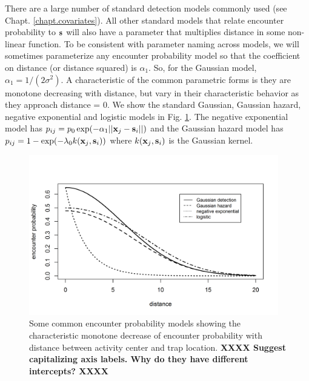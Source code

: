 There are a large number of standard detection models commonly used
(see Chapt. \ref{chapt.covariates}).  All other standard models that
relate encounter probability to ${\bf s}$ will also have a parameter
that multiplies distance in some non-linear function.  To be
consistent with parameter naming across models, we will sometimes
parameterize any encounter probability model so that the coefficient
on distance (or distance squared) is $\alpha_{1}$. So, for the
Gaussian model, $\alpha_{1} = 1/(2\sigma^{2})$.  A characteristic of
the common parametric forms is they are monotone decreasing with
distance, but vary in their characteristic behavior as they approach
distance = 0.  We show the standard Gaussian, Gaussian hazard,
negative exponential and logistic models in
Fig. \ref{scr0.fig.detfuncs}.  The negative exponential model has
$p_{ij} = p_{0}\exp(-\alpha_{1} ||{\bf x}_{j}-{\bf s}_{i}||)$ and the
Gaussian hazard model has 
$p_{ij} = 1-\exp(-\lambda_{0} k({\bf x}_{j},{\bf s}_{i}))$ 
where $k({\bf x}_{j}, {\bf s}_{i})$ is the Gaussian
kernel.
\begin{figure}[ht]
\begin{center}
\includegraphics[height=2.75in]{Ch5-SCR0/figs/det_functions}
\end{center}
\caption{Some common encounter probability models showing the
  characteristic monotone decrease of encounter probability with
  distance between activity center and trap location.
{\bf  XXXX Suggest capitalizing axis labels. Why do they have
   different intercepts? XXXX }
}
\label{scr0.fig.detfuncs}
\end{figure}
